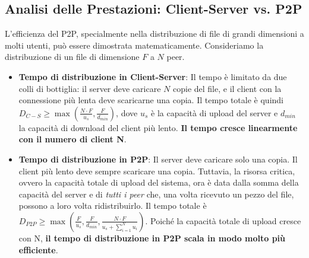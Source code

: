 \subsection{Analisi delle Prestazioni: Client-Server vs. P2P}
L'efficienza del P2P, specialmente nella distribuzione di file di grandi dimensioni a molti utenti, può essere dimostrata matematicamente. Consideriamo la distribuzione di un file di dimensione $F$ a $N$ peer.
\begin{itemize}
    \item \textbf{Tempo di distribuzione in Client-Server}: Il tempo è limitato da due colli di bottiglia: il server deve caricare $N$ copie del file, e il client con la connessione più lenta deve scaricarne una copia. Il tempo totale è quindi $D_{C-S} \ge \max(\frac{N \cdot F}{u_s}, \frac{F}{d_{min}})$, dove $u_s$ è la capacità di upload del server e $d_{min}$ la capacità di download del client più lento. \textbf{Il tempo cresce linearmente con il numero di client N}.
    \item \textbf{Tempo di distribuzione in P2P}: Il server deve caricare solo una copia. Il client più lento deve sempre scaricare una copia. Tuttavia, la risorsa critica, ovvero la capacità totale di upload del sistema, ora è data dalla somma della capacità del server e di \textit{tutti i peer} che, una volta ricevuto un pezzo del file, possono a loro volta ridistribuirlo. Il tempo totale è $D_{P2P} \ge \max(\frac{F}{u_s}, \frac{F}{d_{min}}, \frac{N \cdot F}{u_s + \sum_{i=1}^{N} u_i})$. Poiché la capacità totale di upload cresce con N, \textbf{il tempo di distribuzione in P2P scala in modo molto più efficiente}.
\end{itemize}

